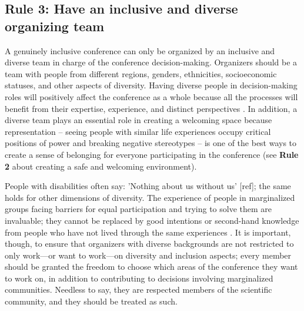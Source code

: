 \documentclass[10pt,letterpaper]{article}
\begin{document}
\subsection*{Rule 3: Have an inclusive and diverse organizing team}
\label{rule_organizing_team}


A genuinely inclusive conference can only be organized by an inclusive and diverse team in charge of the conference decision-making.
Organizers should be a team with people from different regions, genders, ethnicities, socioeconomic statuses, and other aspects of diversity.
Having diverse people in decision-making roles will positively affect the conference as a whole because all the processes will benefit from their expertise, experience, and distinct perspectives \cite{hongGroupsDiverseProblem2004}. 
In addition, a diverse team plays an essential role in creating a welcoming space because representation -- seeing people with similar life experiences occupy critical positions of power and breaking negative stereotypes -- is one of the best ways to create a sense of belonging for everyone participating in the conference (see \textbf{Rule 2} about creating a safe and welcoming environment).

People with disabilities often say: 'Nothing about us without us' [ref]; the same holds for other dimensions of diversity. The experience of people in marginalized groups facing barriers for equal participation and trying to solve them are invaluable; they cannot be replaced by good intentions or second-hand knowledge from people who have not lived through the same experiences \cite{costanzachockDesign2020}.
It is important, though, to ensure that organizers with diverse backgrounds are not restricted to only work—or want to work—on diversity and inclusion aspects; 
every member should be granted the freedom to choose which areas of the conference they want to work on, in addition to contributing to decisions involving marginalized communities. Needless to say, they are respected members of the scientific community, and they should be treated as such.

\end{document}
